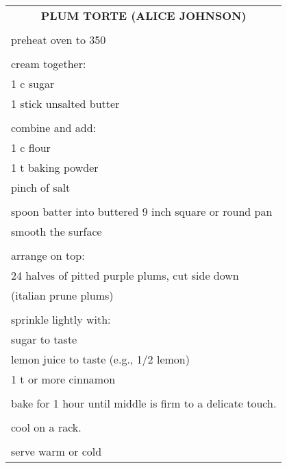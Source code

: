 \documentclass[8pt]{report}
\begin{document}
\begin{tabular}{|l|} \hline	%
 
\multicolumn{1}{|c|}{\textbf{PLUM TORTE (ALICE JOHNSON)}}
\\
\\

\index{desserts!plum torte (alice johnson)} \index{plum torte}
\index{torte!plum}

preheat oven to 350\\
\\
cream together:\\
\hspace{0.5 in}	1 c sugar\\
\hspace{0.5 in}	1 stick unsalted butter\\
\\
combine and add:\\
\hspace{0.5 in}	1 c flour\\
\hspace{0.5 in}	1 t baking powder\\
\hspace{0.5 in}	pinch of salt\\
\\
spoon batter into buttered 9 inch square or round pan\\
smooth the surface\\
\\
arrange on top:\\
\hspace{0.5 in}	24 halves of pitted purple plums, cut side down\\
\hspace{0.5 in}	(italian prune plums)\\
\\
sprinkle lightly with:\\
\hspace{0.5 in}	sugar to taste\\
\hspace{0.5 in}	lemon juice to taste (e.g., 1/2 lemon)\\
\hspace{0.5 in}	1 t or more cinnamon\\
\\
bake for 1 hour until middle is firm to a delicate touch.\\
\\
cool on a rack.\\
\\
serve warm or cold\\


\hline

\end{tabular}
\end{document}
